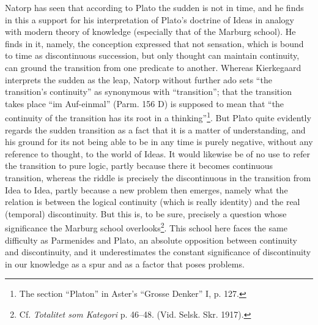 \documentclass[12pt,a4paper,openany]{book}
\newcommand{\opage}[1]{\marginnote{\footnotesize\textit{[#1]}}}
\begin{document}
Natorp has seen that according to Plato the sudden is not
in time, and he finds in this a support for his interpretation
of Plato's doctrine of Ideas in analogy with modern theory of knowledge
(especially that of the Marburg school).  He finds in it, namely,
the conception expressed that not sensation, which is bound
to time as discontinuous succession, but only thought
can maintain continuity, can ground the transition from one predicate
to another.  Whereas Kierkegaard interprets the sudden
as the leap, Natorp without further ado sets ``the transition's
\setcounter{footnote}{0}%
\opage{42}continuity'' as synonymous with ``transition''; that the transition
takes place ``im Auf-einmal'' (Parm. 156 D) is supposed to mean
that ``the continuity of the transition has its root in a thinking''\footnote[1]{The section ``Platon'' in Aster's ``Grosse Denker'' I, p. 127.}.
But Plato quite evidently regards the sudden transition
as a fact that it is a matter of understanding, and his ground
for its not being able to be in any time is purely negative, without
any reference to thought, to the world of Ideas.  It would
likewise be of no use to refer the transition to pure logic,
partly because there it becomes continuous transition, whereas
the riddle is precisely the discontinuous in the transition from Idea
to Idea, partly because a new problem then emerges,
namely what the relation is between the logical continuity
(which is really identity) and the real (temporal)
discontinuity.  But this is, to be sure, precisely a question
whose significance the Marburg school overlooks\footnote[2]{Cf. \textit{Totalitet som Kategori} p. 46--48. (Vid. Selsk. Skr. 1917).}.  This
school here faces the same difficulty as Parmenides
and Plato, an absolute opposition between continuity
and discontinuity, and it underestimates the constant
significance of discontinuity in our knowledge as a spur
and as a factor that poses problems.
\end{document}
